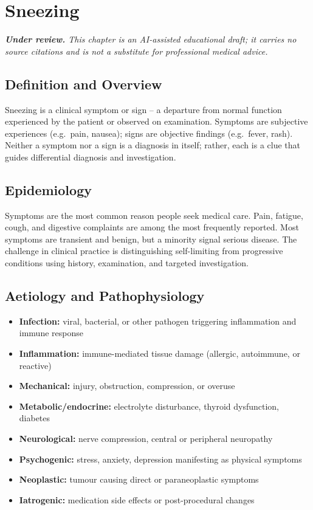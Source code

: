 \chapter{Sneezing}

\medskip
\noindent\textit{\textbf{Under review.} This chapter is an AI-assisted educational draft; it carries no source citations and is not a substitute for professional medical advice.}

\section*{Definition and Overview}
Sneezing is a clinical symptom or sign -- a departure from normal function experienced by the patient or observed on examination. Symptoms are subjective experiences (e.g.\ pain, nausea); signs are objective findings (e.g.\ fever, rash). Neither a symptom nor a sign is a diagnosis in itself; rather, each is a clue that guides differential diagnosis and investigation.

\section*{Epidemiology}
Symptoms are the most common reason people seek medical care. Pain, fatigue, cough, and digestive complaints are among the most frequently reported. Most symptoms are transient and benign, but a minority signal serious disease. The challenge in clinical practice is distinguishing self-limiting from progressive conditions using history, examination, and targeted investigation.

\section*{Aetiology and Pathophysiology}
\begin{itemize}
    \item \textbf{Infection:} viral, bacterial, or other pathogen triggering inflammation and immune response
    \item \textbf{Inflammation:} immune-mediated tissue damage (allergic, autoimmune, or reactive)
    \item \textbf{Mechanical:} injury, obstruction, compression, or overuse
    \item \textbf{Metabolic/endocrine:} electrolyte disturbance, thyroid dysfunction, diabetes
    \item \textbf{Neurological:} nerve compression, central or peripheral neuropathy
    \item \textbf{Psychogenic:} stress, anxiety, depression manifesting as physical symptoms
    \item \textbf{Neoplastic:} tumour causing direct or paraneoplastic symptoms
    \item \textbf{Iatrogenic:} medication side effects or post-procedural changes
\end{itemize}

